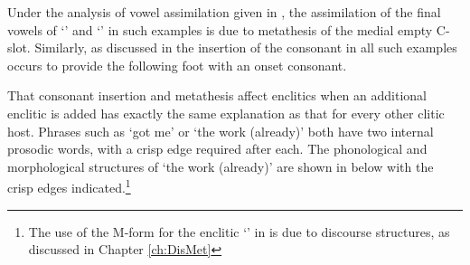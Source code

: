 \begin{exe}
	\label{ex:130825-7, 0.11}
	\label{ex:130825-6, 19.24}
\end{exe}

Under the analysis of vowel assimilation given in ,
the assimilation of the final vowels of  `{\kau}' {\ra} 
and  {\ra}  `{\kai}' in such examples
is due to metathesis of the medial empty C-slot.
Similarly, as discussed in  the insertion of the consonant
in all such examples occurs to provide the following foot with an onset consonant.

That consonant insertion and metathesis affect
enclitics when an additional enclitic is added
has exactly the same explanation as that for every other clitic host.
Phrases such as  `got me'
or  `the work (already)'
both have two internal prosodic words,
with a crisp edge required after each.
The phonological and morphological structures
of  `the work (already)' are shown in 
below with the crisp edges indicated.\footnote{
		The use of the M-form for the enclitic  `{\een}' in 
		is due to discourse structures, as discussed in Chapter \ref{ch:DisMet}}

